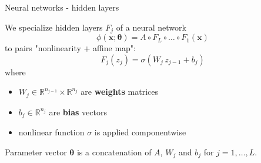 \documentclass[11pt,aspectratio=169,t]{beamer}
\renewcommand{\vec}[1]{\boldsymbol{#1}}
\newcommand{\VTheta}{\ensuremath{\vec{\theta}}}
\newcommand{\R}{\mathbb R}
\newcommand{\xx}{\vec{x}}
\begin{document}
\begin{frame}{Neural networks - hidden layers}

We specialize hidden layers $F_{j}$ of a neural network
\[
    \phi(\xx; \VTheta) = A \circ F_{L} \circ \dots \circ F_1(\xx)
\]
to pairs "nonlinearity + affine map":
\[
    F_j(z_{j}) = \sigma(W_j \, z_{j-1} + b_j)
\]
where
\begin{itemize}
    \item \(W_j \in \R^{n_{j-1}} \times \R^{n_j}\) are \textbf{weights} matrices
    \item \(b_j \in \R^{n_j}\) are \textbf{bias} vectors
    \item nonlinear function \(\sigma\) is applied componentwise
\end{itemize}

Parameter vector $\VTheta$ is a concatenation of $A$, $W_{j}$ and $b_{j}$ for
$j = 1, \dots, L$.

\end{frame}
\end{document}
